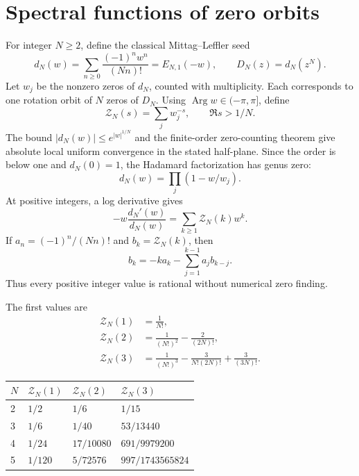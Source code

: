 \documentclass[11pt,oneside,openany]{book}
\begin{document}



\chapter{Spectral functions of zero orbits}\label{ch:spectra}
For integer $N\ge2$, define the classical Mittag--Leffler seed~\cite[\S10.46]{DLMF}
\[
d_N(w)=\sum_{n\ge0}\frac{(-1)^nw^n}{(Nn)!}=E_{N,1}(-w),
\qquad D_N(z)=d_N(z^N).
\]
Let $w_j$ be the nonzero zeros of $d_N$, counted with multiplicity. Each
corresponds to one rotation orbit of $N$ zeros of $D_N$. Using
$\operatorname{Arg}w\in(-\pi,\pi]$, define
\[
\boxed{\mathcal Z_N(s)=\sum_jw_j^{-s},\qquad\Re s>1/N.}
\]
The bound $|d_N(w)|\le e^{|w|^{1/N}}$ and the finite-order zero-counting theorem
give absolute local uniform convergence in the stated half-plane. Since the
order is below one and $d_N(0)=1$, the Hadamard factorization has genus zero:
\[
d_N(w)=\prod_j(1-w/w_j).
\]
At positive integers, a log derivative gives
\[
-w\frac{d_N'(w)}{d_N(w)}=\sum_{k\ge1}\mathcal Z_N(k)w^k.
\]
If $a_n=(-1)^n/(Nn)!$ and $b_k=\mathcal Z_N(k)$, then
\[
b_k=-ka_k-\sum_{j=1}^{k-1}a_jb_{k-j}.
\]
Thus every positive integer value is rational without numerical zero finding.

The first values are
\[
\begin{aligned}
\mathcal Z_N(1)&=\frac1{N!},\\
\mathcal Z_N(2)&=\frac1{(N!)^2}-\frac2{(2N)!},\\
\mathcal Z_N(3)&=\frac1{(N!)^3}-\frac3{N!(2N)!}+\frac3{(3N)!}.
\end{aligned}
\]
\begin{tabular}{@{}llll@{}}\toprule
$N$ & $\mathcal Z_N(1)$ & $\mathcal Z_N(2)$ & $\mathcal Z_N(3)$\\\midrule
2 & $1/2$ & $1/6$ & $1/15$\\
3 & $1/6$ & $1/40$ & $53/13440$\\
4 & $1/24$ & $17/10080$ & $691/9979200$\\
5 & $1/120$ & $5/72576$ & $997/1743565824$\\
\bottomrule\end{tabular}
\end{document}
